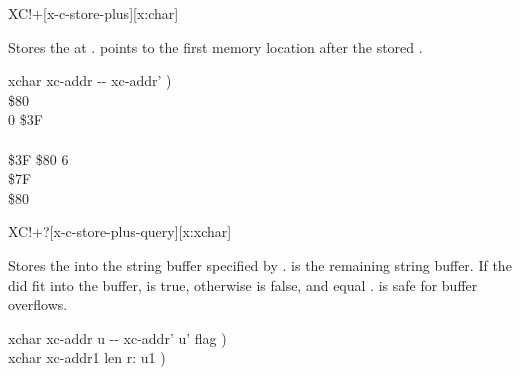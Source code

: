 \begin{worddef*}{}{XC!+}[x-c-store-plus][x:char]
\item {}

	Stores the  at .  
	points to the first memory location after the stored .

	\begin{implement}
	\word{:}   xchar xc-addr -{}- xc-addr' ) \\
	\tab {} \$80          \\
	\tab {} 0  \$3F \\
	\tab {}    \\
	\tab[2]    \$3F  \$80   6   \\
	\tab {} \$7F     \\
	\tab {}  \$80         \\
	\word{;}
	\end{implement}
\end{worddef*}


\begin{worddef*}[XC!+q]{}{XC!+?}[x-c-store-plus-query][x:xchar]
\item {}

	Stores the  into the string buffer specified by
	.   is the remaining string
	buffer.  If the  did fit into the buffer, \param{flag}
	is true, otherwise  is false, and \param{xc-addr_2 u_2}
	equal .   is safe for buffer overflows.

	\begin{implement}
	\word{:}   xchar xc-addr u -{}- xc-addr' u' flag ) \\
	\tab {}        xchar xc-addr1 len r: u1 ) \\
	\tab[2]   \\
	\tab[2]     \\
	\tab {} \\
	\tab[2]      \word{-}  \\
	\tab {} \word{;}
	\end{implement}

	\begin{testing}
	\end{testing}
\end{worddef*}


